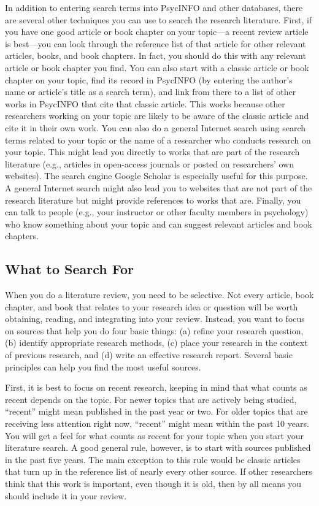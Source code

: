 \documentclass[
]{krantz}
\begin{document}
In addition to entering search terms into PsycINFO and other databases, there are several other techniques you can use to search the research literature. First, if you have one good article or book chapter on your topic---a recent review article is best---you can look through the reference list of that article for other relevant articles, books, and book chapters. In fact, you should do this with any relevant article or book chapter you find. You can also start with a classic article or book chapter on your topic, find its record in PsycINFO (by entering the author's name or article's title as a search term), and link from there to a list of other works in PsycINFO that cite that classic article. This works because other researchers working on your topic are likely to be aware of the classic article and cite it in their own work. You can also do a general Internet search using search terms related to your topic or the name of a researcher who conducts research on your topic. This might lead you directly to works that are part of the research literature (e.g., articles in open-access journals or posted on researchers' own websites). The search engine Google Scholar is especially useful for this purpose. A general Internet search might also lead you to websites that are not part of the research literature but might provide references to works that are. Finally, you can talk to people (e.g., your instructor or other faculty members in psychology) who know something about your topic and can suggest relevant articles and book chapters.

\hypertarget{what-to-search-for}{%
\subsection*{What to Search For}\label{what-to-search-for}}


When you do a literature review, you need to be selective. Not every article, book chapter, and book that relates to your research idea or question will be worth obtaining, reading, and integrating into your review. Instead, you want to focus on sources that help you do four basic things: (a) refine your research question, (b) identify appropriate research methods, (c) place your research in the context of previous research, and (d) write an effective research report. Several basic principles can help you find the most useful sources.

First, it is best to focus on recent research, keeping in mind that what counts as recent depends on the topic. For newer topics that are actively being studied, ``recent'' might mean published in the past year or two. For older topics that are receiving less attention right now, ``recent'' might mean within the past 10 years. You will get a feel for what counts as recent for your topic when you start your literature search. A good general rule, however, is to start with sources published in the past five years. The main exception to this rule would be classic articles that turn up in the reference list of nearly every other source. If other researchers think that this work is important, even though it is old, then by all means you should include it in your review.
\end{document}
